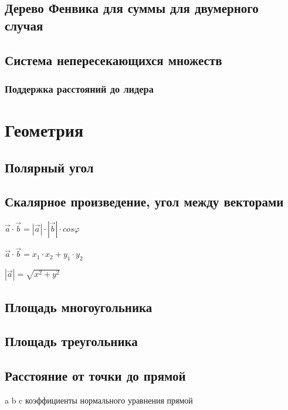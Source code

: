 \documentclass[a4paper]{article}
\begin{document}
\begin{multicols*}{2}
		 \subsection{Дерево Фенвика для суммы для двумерного случая}
		 
		 \subsection{Система непересекающихся множеств}
		 
		 \subsubsection{Поддержка расстояний до лидера}
		 
		 
		 \section{Геометрия}
		 \subsection{Полярный угол}
		 
		 \subsection{Скалярное произведение, угол между векторами}
		 
		 $\vec a \cdot \vec b = |\vec a| \cdot |\vec b| \cdot cos \varphi$
		 
		 $\vec a \cdot \vec b = x_1 \cdot x_2 + y_1 \cdot y_2$
		 
		 $|\vec a| = \sqrt{x^2 + y^2}$
		 
		 \subsection{Площадь многоугольника}
		 		 
		 \subsection{Площадь треугольника}
		 
		 \subsection{Расстояние от точки до прямой}
		 a b c коэффициенты нормального уравнения прямой
		 

\end{multicols*}
\end{document}
